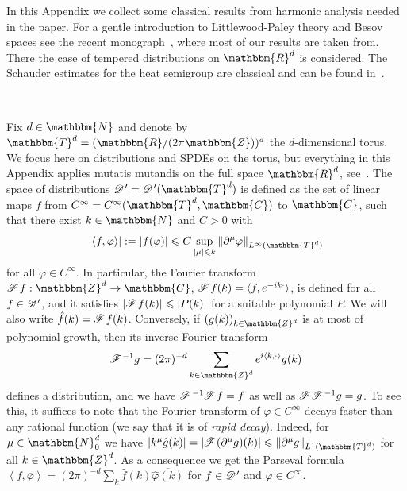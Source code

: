 \documentclass[11pt,reqno]{amsart}
\newcommand{\assign}{:=}
\newcommand{\cdummy}{\cdot}
\newcommand{\tmtextit}[1]{{\itshape{#1}}}
\newcommand{\CD}{\mathscr{D} \hspace{.1em}}
\newcommand{\CF}{\mathscr{F} \hspace{.1em}}
\begin{document}
In this Appendix we collect some classical results from harmonic analysis
needed in the paper. For a gentle introduction to Littlewood-Paley theory and
Besov spaces see the recent monograph~{\cite{bahouri_fourier_2011}}, where
most of our results are taken from. There the case of tempered distributions
on $\mathbbm{R}^d$ is considered. The Schauder estimates for the heat
semigroup are classical and can be found
in~{\cite{gubinelli_paracontrolled_2015,gubinelli_lectures_2015}}.

\

Fix $d \in \mathbbm{N}$ and denote by $\mathbbm{T}^d = (\mathbbm{R}/ (2 \pi
\mathbbm{Z}))^d$ the $d$-dimensional torus. We focus here on distributions and
SPDEs on the torus, but everything in this Appendix applies mutatis mutandis
on the full space $\mathbbm{R}^d$, see~{\cite{gubinelli_paracontrolled_2015}}.
The space of distributions $\CD' = \CD' (\mathbbm{T}^d)$ is defined as the set
of linear maps $f$ from $C^{\infty} = C^{\infty} (\mathbbm{T}^d, \mathbbm{C})$
to $\mathbbm{C}$, such that there exist $k \in \mathbbm{N}$ and $C > 0$ with
\[ | \langle f, \varphi \rangle | \assign | f (\varphi) | \leqslant C \sup_{|
   \mu | \leqslant k} \| \partial^{\mu} \varphi \|_{L^{\infty}
   (\mathbbm{T}^d)} \]
for all $\varphi \in C^{\infty}$. In particular, the Fourier transform $\CF f
: \mathbbm{Z}^d \rightarrow \mathbbm{C}$, $\CF f (k) = \langle f, e^{- i k
\cdummy} \rangle$, is defined for all $f \in \CD'$, and it satisfies $\left|
\CF f (k) \right| \leqslant | P (k) |$ for a suitable polynomial $P$. We will
also write $\hat{f} (k) = \CF f (k)$. Conversely, if $(g (k))_{k \in
\mathbbm{Z}^d}$ is at most of polynomial growth, then its inverse Fourier
transform
\[ \CF^{- 1} g = (2 \pi)^{- d} \sum_{k \in \mathbbm{Z}^d} e^{i \langle k,
   \cdummy \rangle} g (k) \]
defines a distribution, and we have $\CF^{- 1} \CF f = f$ as well as $\CF
\CF^{- 1} g = g$. To see this, it suffices to note that the Fourier transform
of $\varphi \in C^{\infty}$ decays faster than any rational function (we say
that it is of \tmtextit{rapid decay}). Indeed, for $\mu \in \mathbbm{N}^d_0$
we have $| k^{\mu} \hat{g} (k) | = \left| \CF (\partial^{\mu} g) (k) \right|
\leqslant \| \partial^{\mu} g \|_{L^1 (\mathbbm{T}^d)}$ for all $k \in
\mathbbm{Z}^d$. As a consequence we get the Parseval formula $\left\langle f,
\overline{\varphi} \right\rangle = (2 \pi)^{- d} \sum_k \hat{f} (k)
\overline{\hat{\varphi} (k)}$ for $f \in \CD'$ and $\varphi \in C^{\infty}$.
\end{document}
